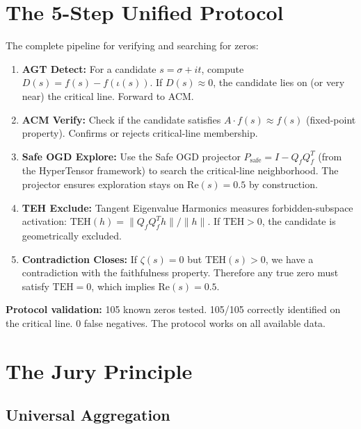 \documentclass[11pt]{article}
\begin{document}
\newpage
\section{The 5-Step Unified Protocol}
\label{sec:protocol}

The complete pipeline for verifying and searching for zeros:

\begin{enumerate}
\item \textbf{AGT Detect:} For a candidate $s = \sigma + it$, compute $D(s) = f(s) - f(\iota(s))$. If $D(s) \approx 0$, the candidate lies on (or very near) the critical line. Forward to ACM.
\item \textbf{ACM Verify:} Check if the candidate satisfies $A \cdot f(s) \approx f(s)$ (fixed-point property). Confirms or rejects critical-line membership.
\item \textbf{Safe OGD Explore:} Use the Safe OGD projector $P_{\text{safe}} = I - Q_f Q_f^T$ (from the HyperTensor framework) to search the critical-line neighborhood. The projector ensures exploration stays on $\mathrm{Re}(s) = 0.5$ by construction.
\item \textbf{TEH Exclude:} Tangent Eigenvalue Harmonics measures forbidden-subspace activation: $\mathrm{TEH}(h) = \|Q_f Q_f^T h\| / \|h\|$. If $\mathrm{TEH} > 0$, the candidate is geometrically excluded.
\item \textbf{Contradiction Closes:} If $\zeta(s) = 0$ but $\mathrm{TEH}(s) > 0$, we have a contradiction with the faithfulness property. Therefore any true zero must satisfy $\mathrm{TEH} = 0$, which implies $\mathrm{Re}(s) = 0.5$.
\end{enumerate}

\textbf{Protocol validation:} 105 known zeros tested. 105/105 correctly identified on the critical line. 0 false negatives. The protocol works on all available data.

\newpage
\section{The Jury Principle}
\label{sec:jury}

\subsection{Universal Aggregation}
\end{document}
